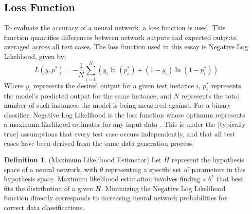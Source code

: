 \documentclass{article}
\theoremstyle{definition}
\newtheorem{definition}{Definition}[section]
\begin{document}
\subsection{Loss Function}
\label{sec:lossfunc}
To evaluate the accuracy of a neural network, a loss function is used. This function quantifies differences between network outputs and expected outputs, averaged across all test cases.
The loss function used in this essay is Negative Log Likelihood, given by:
\begin{equation}
L(y, p^*) = - \frac{1}{N} \sum_{i=1}^N (y_i\ln(p^*_i) + (1-y_i)\ln(1-p^*_i))
\end{equation}
Where $y_i$ represents the desired output for a given test instance $i$, $p_i^*$ represents the model's predicted output for the same instance, and $N$ represents the total number of such instances the model is being measured against.
For a binary classifier, Negative Log Likelihood is the loss function whose optimum represents a maximum likelihood estimator for any input data \cite{mll}. This is under the (typically true) assumptions that every test case occurs independently, and that all test cases have been derived from the same data generation process. 
\begin{definition}(Maximum Likelihood Estimator)
Let $H$ represent the hypothesis space of a neural network, with $\theta$ representing a specific set of parameters in this hypothesis space. Maximum likelihood estimation involves finding a $\theta^*$ that best fits the distribution of a given $H$. Minimizing the Negative Log Likelihood function directly corresponds to increasing neural network probabilities for correct data classifications. 
\end{definition}
\end{document}
